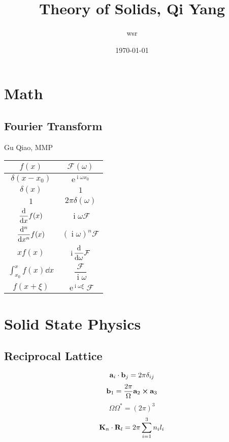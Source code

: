 \documentclass[a4paper]{article}
\title{Theory of Solids, Qi Yang}
\author{wsr}
\date{\today} %
\DeclareMathOperator{\e}{\mathrm{e}}
\DeclareMathOperator{\I}{\mathrm{i}}
\newcommand{\dis}{\displaystyle}
\numberwithin{equation}{section}
\begin{document}
\maketitle

\tableofcontents

\newpage

\setcounter{section}{-3}

\section{Math}
\subsection{Fourier Transform}
Gu Qiao, MMP
\renewcommand\arraystretch{2}
\begin{table}[H]
	\begin{tabular}{|c|c|}
		\hline
		$ f(x) $ & $ \mathcal{F}(\omega) $ \\ \hline
	$ \delta(x-x_0) $ & $ \e^{\I\omega x_0} $ \\
	$ \delta(x) $     & $ 1 $ \\
	$ 1 $ & $ 2\pi\delta(\omega) $ \\ \hline
	$ \dis\dv{x} f(x) $ & $ \I\omega \mathcal{F} $ \\
	$ \dis\dv[n]{x} f(x) $ & $ (\I\omega)^n \mathcal{F} $ \\
	$ x f(x) $      & $ \I\dis\dv{\omega}\mathcal{F} $ \\
	$ \dis\int_{x_0}^x f(x)\dd x $ & $ \dfrac{\mathcal{F}}{\I\omega} $ \\
	$ f(x + \xi) $  & $ \e^{\I\omega\xi} \mathcal{F} $ \\
	\hline
	\end{tabular}
\end{table}

\section{Solid State Physics}
\subsection{Reciprocal Lattice}
\begin{equation}\label{key}
\vb{a}_i \cdot \vb{b}_j = 2\pi \delta_{ij}
\end{equation}
\begin{equation}\label{key}
\vb{b}_1 = \dfrac{2\pi}{\Omega} \vb{a}_2 \cross \vb{a}_3
\end{equation}
\begin{equation}\label{key}
\Omega \Omega^* = (2\pi)^3
\end{equation}
\begin{equation}\label{key}
\vb{K}_n \cdot \vb{R}_l = 2\pi \sum_{i=1}^3 n_i l_i
\end{equation}
\end{document}
